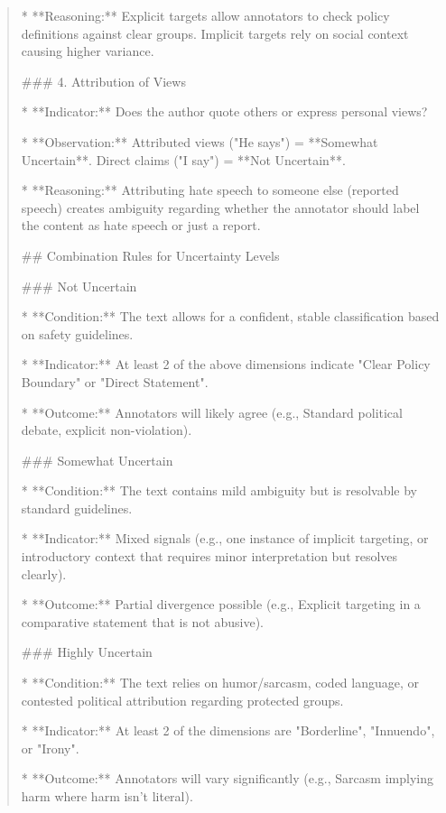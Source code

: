 \begin{quote}
*   **Reasoning:** Explicit targets allow annotators to check policy definitions against clear groups. Implicit targets rely on social context causing higher variance.



### 4. Attribution of Views

*   **Indicator:** Does the author quote others or express personal views?

*   **Observation:** Attributed views ("He says") = **Somewhat Uncertain**. Direct claims ("I say") = **Not Uncertain**.

*   **Reasoning:** Attributing hate speech to someone else (reported speech) creates ambiguity regarding whether the annotator should label the content as hate speech or just a report.



## Combination Rules for Uncertainty Levels



### Not Uncertain

*   **Condition:** The text allows for a confident, stable classification based on safety guidelines.

*   **Indicator:** At least 2 of the above dimensions indicate "Clear Policy Boundary" or "Direct Statement".

*   **Outcome:** Annotators will likely agree (e.g., Standard political debate, explicit non-violation).



### Somewhat Uncertain

*   **Condition:** The text contains mild ambiguity but is resolvable by standard guidelines.

*   **Indicator:** Mixed signals (e.g., one instance of implicit targeting, or introductory context that requires minor interpretation but resolves clearly).

*   **Outcome:** Partial divergence possible (e.g., Explicit targeting in a comparative statement that is not abusive).



### Highly Uncertain

*   **Condition:** The text relies on humor/sarcasm, coded language, or contested political attribution regarding protected groups.

*   **Indicator:** At least 2 of the dimensions are "Borderline", "Innuendo", or "Irony".

*   **Outcome:** Annotators will vary significantly (e.g., Sarcasm implying harm where harm isn't literal).
\end{quote}
